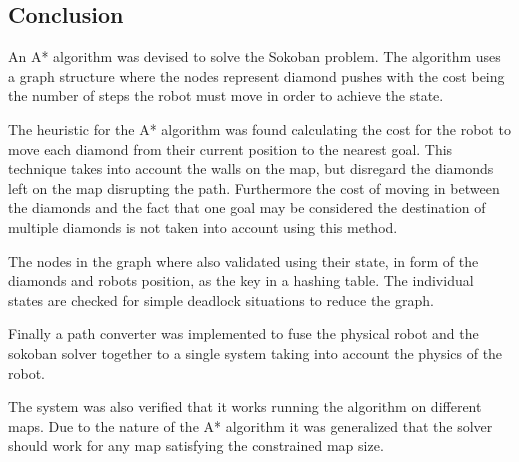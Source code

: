 \subsection{Conclusion}
An A* algorithm was devised to solve the Sokoban problem.
The algorithm uses a graph structure where the nodes represent diamond pushes with the cost being the number of steps the robot must move in order to achieve the state.

The heuristic for the A* algorithm was found calculating the cost for the robot to move each diamond from their current position to the nearest goal.
This technique takes into account the walls on the map, but disregard the diamonds left on the map disrupting the path.
Furthermore the cost of moving in between the diamonds and the fact that one goal may be considered the destination of multiple diamonds is not taken into account using this method.

The nodes in the graph where also validated using their state, in form of the diamonds and robots position, as the key in a hashing table.
The individual states are checked for simple deadlock situations to reduce the graph.

Finally a path converter was implemented to fuse the physical robot and the sokoban solver together to a single system taking into account the physics of the robot.

The system was also verified that it works running the algorithm on different maps.
Due to the nature of the A* algorithm it was generalized that the solver should work for any map satisfying the constrained map size.


